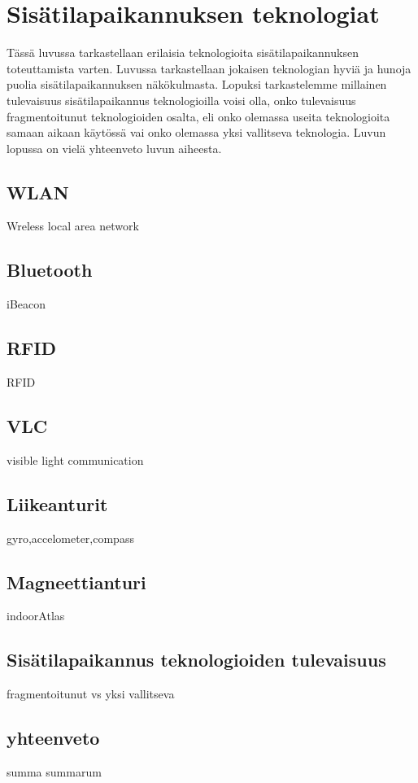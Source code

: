 \section{Sisätilapaikannuksen teknologiat}
Tässä luvussa tarkastellaan erilaisia teknologioita sisätilapaikannuksen toteuttamista varten. Luvussa tarkastellaan jokaisen teknologian hyviä ja hunoja puolia sisätilapaikannuksen näkökulmasta. Lopuksi tarkastelemme millainen tulevaisuus sisätilapaikannus teknologioilla voisi olla, onko tulevaisuus fragmentoitunut teknologioiden osalta, eli onko olemassa useita teknologioita samaan aikaan käytössä vai onko olemassa yksi vallitseva teknologia. Luvun lopussa on vielä yhteenveto luvun aiheesta.
\subsection{WLAN}
Wreless local area network
\subsection{Bluetooth}
iBeacon
\subsection{RFID}
RFID
\subsection{VLC}
visible light communication
\subsection{Liikeanturit}
gyro,accelometer,compass
\subsection{Magneettianturi}
indoorAtlas
\subsection{Sisätilapaikannus teknologioiden tulevaisuus}
fragmentoitunut vs yksi vallitseva
\subsection{yhteenveto}
summa summarum

